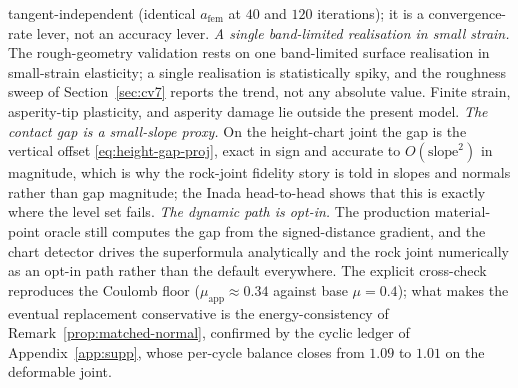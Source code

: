 \documentclass{svjour3}                 %
\newcommand{\muapp}{\mu_{\mathrm{app}}}
\begin{document}
tangent-independent (identical $a_{\mathrm{fem}}$ at $40$ and $120$ iterations); it is a convergence-rate lever,
not an accuracy lever.
\emph{A single band-limited realisation in small strain.} The rough-geometry validation rests on one band-limited
surface realisation in small-strain elasticity; a single realisation is statistically spiky, and the roughness sweep
of Section~\ref{sec:cv7} reports the trend, not any absolute value. Finite strain, asperity-tip plasticity, and
asperity damage lie outside the present model.
\emph{The contact gap is a small-slope proxy.} On the height-chart joint the gap is the vertical offset
\eqref{eq:height-gap-proj}, exact in sign and accurate to $O(\text{slope}^2)$ in magnitude, which is why the rock-joint fidelity
story is told in slopes and normals rather than gap magnitude; the Inada head-to-head shows that this is exactly
where the level set fails.
\emph{The dynamic path is opt-in.} The production material-point oracle still computes the gap from the
signed-distance gradient, and the chart detector drives the superformula analytically and the rock joint numerically as an opt-in path
rather than the default everywhere. The explicit cross-check reproduces the Coulomb floor
($\muapp\approx0.34$ against base $\mu=0.4$); what makes the eventual replacement conservative is the
energy-consistency of Remark~\ref{prop:matched-normal}, confirmed by the cyclic ledger of
Appendix~\ref{app:supp}, whose per-cycle balance closes from $1.09$ to $1.01$ on the deformable joint.
\end{document}
